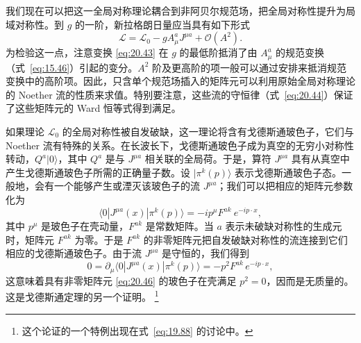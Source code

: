 我们现在可以把这一全局对称理论耦合到非阿贝尔规范场，把全局对称性提升为局域对称性。到 $g$ 的一阶，新拉格朗日量应当具有如下形式
\begin{equation}
  \mathcal{L} = \mathcal{L}_0 - gA^a_\mu J^{\mu a} + \mathcal{O}(A^2) .
  \label{eq:20.45}
\end{equation}
为检验这一点，注意变换 \eqref{eq:20.43} 在 $g$ 的最低阶抵消了由 $A^a_\mu$ 的规范变换（式~\eqref{eq:15.46}）引起的变分。$A^2$ 阶及更高阶的项一般可以通过安排来抵消规范变换中的高阶项。因此，只含单个规范场插入的矩阵元可以利用原始全局对称理论的 Noether 流的性质来求值。特别要注意，这些流的守恒律（式~\eqref{eq:20.44}）保证了这些矩阵元的 Ward 恒等式得到满足。

如果理论 $\mathcal{L}_0$ 的全局对称性被自发破缺，这一理论将含有戈德斯通玻色子，它们与 Noether 流有特殊的关系。在长波长下，戈德斯通玻色子成为真空的无穷小对称性转动，$Q^a|0\rangle$，其中 $Q^a$ 是与 $J^{\mu a}$ 相关联的全局荷。于是，算符 $J^{\mu a}$ 具有从真空中产生戈德斯通玻色子所需的正确量子数。设 $|\pi^k(p)\rangle$ 表示戈德斯通玻色子态。一般地，会有一个能够产生或湮灭该玻色子的流 $J^{\mu a}$；我们可以把相应的矩阵元参数化为
\begin{equation}
  \langle 0|J^{\mu a}(x)|\pi^k(p)\rangle = -ip^\mu F^{ak}\ e^{-ip\cdot x} ,
  \label{eq:20.46}
\end{equation}
其中 $p^\mu$ 是玻色子在壳动量，$F^{ak}$ 是常数矩阵。当 $a$ 表示未破缺对称性的生成元时，矩阵元 $F^{ak}$ 为零。于是 $F^{ak}$ 的非零矩阵元把自发破缺对称性的流连接到它们相应的戈德斯通玻色子。由于流 $J^{\mu a}$ 是守恒的，我们得到
\begin{equation}
  0 = \partial_\mu\langle 0|J^{\mu a}(x)|\pi^k(p)\rangle
  = -p^2 F^{ak}\,e^{-ip\cdot x} ,
  \label{eq:20.47}
\end{equation}
这意味着具有非零矩阵元 \eqref{eq:20.46} 的玻色子在壳满足 $p^2 = 0$，因而是无质量的。这是戈德斯通定理的另一个证明。%
\footnote{这个论证的一个特例出现在式~\eqref{eq:19.88} 的讨论中。}

